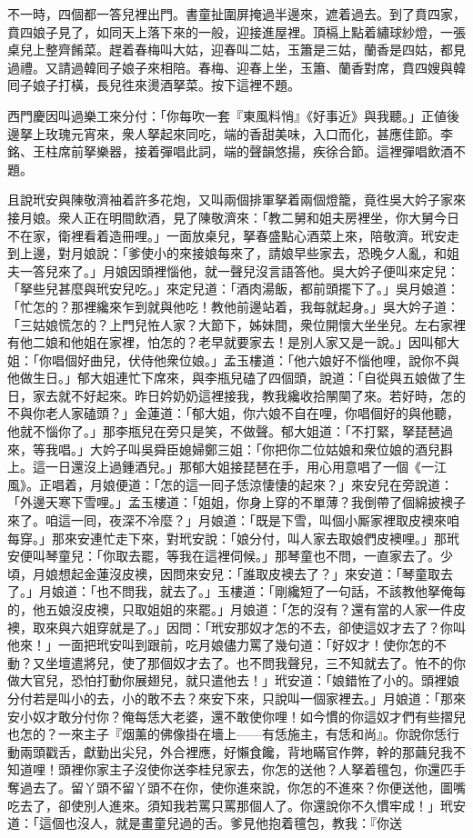 不一時，四個都一答兒裡出門。書童扯圍屏掩過半邊來，遮着過去。到了賁四家，賁四娘子見了，如同天上落下來的一般，迎接進屋裡。頂槅上點着繡球紗燈，一張桌兒上整齊餚菜。趕着春梅叫大姑，迎春叫二姑，玉簫是三姑，蘭香是四姑，都見過禮。又請過韓囘子娘子來相陪。春梅、迎春上坐，玉簫、蘭香對席，賁四嫂與韓囘子娘子打橫，長兒徃來燙酒拏菜。按下這裡不題。

西門慶因叫過樂工來分付：「你每吹一套『東風料悄』《好事近》與我聽。」正値後邊拏上玫瑰元宵來，衆人拏起來同吃，端的香甜美味，入口而化，甚應佳節。李銘、王柱席前拏樂器，接着彈唱此詞，端的聲韻悠揚，疾徐合節。這裡彈唱飲酒不題。

且說玳安與陳敬濟袖着許多花炮，又叫兩個排軍拏着兩個燈籠，竟徃吳大妗子家來接月娘。衆人正在明間飲酒，見了陳敬濟來：「教二舅和姐夫房裡坐，你大舅今日不在家，衛裡看着造冊哩。」一面放桌兒，拏春盛點心酒菜上來，陪敬濟。玳安走到上邊，對月娘說：「爹使小的來接娘每來了，請娘早些家去，恐晚夕人亂，和姐夫一答兒來了。」月娘因頭裡惱他，就一聲兒沒言語答他。吳大妗子便叫來定兒：「拏些兒甚麼與玳安兒吃。」來定兒道：「酒肉湯飯，都前頭擺下了。」吳月娘道：「忙怎的？那裡纔來乍到就與他吃！教他前邊站着，我每就起身。」吳大妗子道：「三姑娘慌怎的？上門兒恠人家？大節下，姊妹間，衆位開懷大坐坐兒。左右家裡有他二娘和他姐在家裡，怕怎的？老早就要家去！是別人家又是一說。」因叫郁大姐：「你唱個好曲兒，伏侍他衆位娘。」孟玉樓道：「他六娘好不惱他哩，說你不與他做生日。」郁大姐連忙下席來，與李瓶兒磕了四個頭，說道：「自從與五娘做了生日，家去就不好起來。昨日妗奶奶這裡接我，教我纔收拾䦛䦟了來。若好時，怎的不與你老人家磕頭？」金蓮道：「郁大姐，你六娘不自在哩，你唱個好的與他聽，他就不惱你了。」那李瓶兒在旁只是笑，不做聲。{}郁大姐道：「不打緊，拏琵琶過來，等我唱。」大妗子叫吳舜臣媳婦鄭三姐：「你把你二位姑娘和衆位娘的酒兒斟上。這一日還沒上過鍾酒兒。」那郁大姐接琵琶在手，用心用意唱了一個《一江風》。正唱着，月娘便道：「怎的這一囘子恁涼悽悽的起來？」來安兒在旁說道：「外邊天寒下雪哩。」孟玉樓道：「姐姐，你身上穿的不單薄？我倒帶了個綿披襖子來了。咱這一囘，夜深不冷麼？」月娘道：「既是下雪，叫個小厮家裡取皮襖來咱每穿。」那來安連忙走下來，對玳安說：「娘分付，叫人家去取娘們皮襖哩。」那玳安便叫琴童兒：「你取去罷，等我在這裡伺候。」那琴童也不問，一直家去了。少頃，月娘想起金蓮沒皮襖，因問來安兒：「誰取皮襖去了？」來安道：「琴童取去了。」月娘道：「也不問我，就去了。」玉樓道：「剛纔短了一句話，不該教他拏俺每的，他五娘沒皮襖，只取姐姐的來罷。」月娘道：「怎的沒有？還有當的人家一件皮襖，取來與六姐穿就是了。」因問：「玳安那奴才怎的不去，卻使這奴才去了？你叫他來！」一面把玳安叫到跟前，吃月娘儘力罵了幾句道：「好奴才！使你怎的不動？又坐壇遣將兒，使了那個奴才去了。也不問我聲兒，三不知就去了。恠不的你做大官兒，恐怕打動你展翅兒，就只遣他去！」玳安道：「娘錯恠了小的。頭裡娘分付若是叫小的去，小的敢不去？來安下來，只說叫一個家裡去。」月娘道：「那來安小奴才敢分付你？俺每恁大老婆，還不敢使你哩！如今慣的你這奴才們有些摺兒也怎的？一來主子『烟薰的佛像掛在墻上——有恁施主，有恁和尚』。你說你恁行動兩頭戳舌，獻勤出尖兒，外合裡應，好懶食饞，背地瞞官作弊，幹的那繭兒我不知道哩！頭裡你家主子沒使你送李桂兒家去，你怎的送他？人拏着氊包，你還匹手奪過去了。留丫頭不留丫頭不在你，使你進來說，你怎的不進來？你便送他，圖嘴吃去了，卻使別人進來。須知我若罵只罵那個人了。你還說你不久慣牢成！」玳安道：「這個也沒人，就是畫童兒過的舌。爹見他抱着氊包，教我：『你送